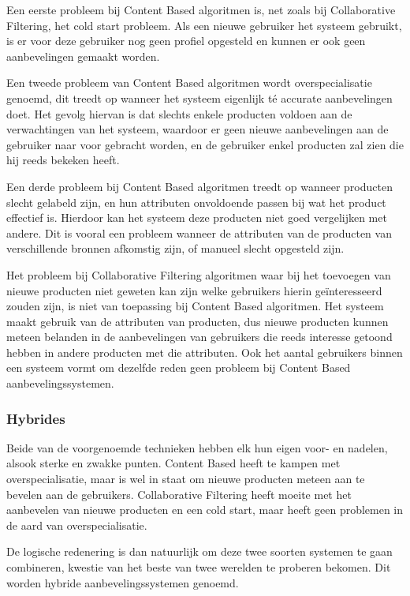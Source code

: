 Een eerste probleem bij Content Based algoritmen is, net zoals bij Collaborative Filtering, het cold start probleem. Als een nieuwe gebruiker het systeem gebruikt, is er voor deze gebruiker nog geen profiel opgesteld en kunnen er ook geen aanbevelingen gemaakt worden.

Een tweede probleem van Content Based algoritmen wordt overspecialisatie genoemd, dit treedt op wanneer het systeem eigenlijk té accurate aanbevelingen doet. Het gevolg hiervan is dat slechts enkele producten voldoen aan de verwachtingen van het systeem, waardoor er geen nieuwe aanbevelingen aan de gebruiker naar voor gebracht worden, en de gebruiker enkel producten zal zien die hij reeds bekeken heeft. 

Een derde probleem bij Content Based algoritmen treedt op wanneer producten slecht gelabeld zijn, en hun attributen onvoldoende passen bij wat het product effectief is. Hierdoor kan het systeem deze producten niet goed vergelijken met andere. Dit is vooral een probleem wanneer de attributen van de producten van verschillende bronnen afkomstig zijn, of manueel slecht opgesteld zijn.

Het probleem bij Collaborative Filtering algoritmen waar bij het toevoegen van nieuwe producten niet geweten kan zijn welke gebruikers hierin geïnteresseerd zouden zijn, is niet van toepassing bij Content Based algoritmen. Het systeem maakt gebruik van de attributen van producten, dus nieuwe producten kunnen meteen belanden in de aanbevelingen van gebruikers die reeds interesse getoond hebben in andere producten met die attributen. Ook het aantal gebruikers binnen een systeem vormt om dezelfde reden geen probleem bij Content Based aanbevelingssystemen. 


\subsubsection{Hybrides}
\label{sec:Hybrides}

Beide van de voorgenoemde technieken hebben elk hun eigen voor- en nadelen, alsook sterke en zwakke punten. Content Based heeft te kampen met overspecialisatie, maar is wel in staat om nieuwe producten meteen aan te bevelen aan de gebruikers. Collaborative Filtering heeft moeite met het aanbevelen van nieuwe producten en een cold start, maar heeft geen problemen in de aard van overspecialisatie.

De logische redenering is dan natuurlijk om deze twee soorten systemen te gaan combineren, kwestie van het beste van twee werelden te proberen bekomen. Dit worden hybride aanbevelingssystemen \autocite{Cano2017} genoemd.

